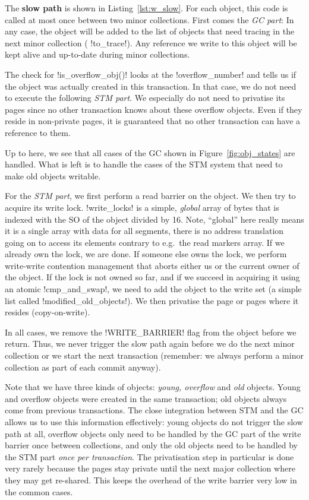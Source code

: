\documentclass{sigplanconf}
\makeatletter
\renewcommand\lstinline[1][]{%
  \Collectverb{\@@myverb}%
}
\def\@@myverb#1{%
    \begingroup
    \fboxsep=0.2em
    \colorbox{verylightgray}{\oldlstinline|#1|}%
    \endgroup
}
\makeatother
\begin{document}
The \textbf{slow path} is shown in Listing~\ref{lst:w_slow}.  For
each object, this code is called at most once between two minor collections.
First comes the \emph{GC part}: In any case, the object will be added
to the list of objects that need tracing in the next minor collection
(\lstinline!to_trace!). Any reference we write to this object will
be kept alive and up-to-date during minor collections.

The check for \lstinline!is_overflow_obj()! looks at the
\lstinline!overflow_number!  and tells us if the object was actually
created in this transaction. In that case, we do not need to execute
the following \emph{STM part}.  We especially do not need to privatise
its pages since no other transaction knows about these overflow
objects. Even if they reside in non-private pages, it is guaranteed
that no other transaction can have a reference to them.

Up to here, we see that all cases of the GC shown in
Figure~\ref{fig:obj_states} are handled. What is left is to handle the
cases of the STM system that need to make old objects writable.

For the \emph{STM part}, we first perform a read barrier on the
object. We then try to acquire its write lock. \lstinline!write_locks!
is a simple, \emph{global} array of bytes that is indexed with the
SO of the object divided by 16. Note, ``global'' here really means
it is a single array with data for all segments, there is no address
translation going on to access its elements contrary to e.g.\ the
read markers array.  If we already own the lock, we are done.
If someone else owns the lock, we perform  write-write contention
management that aborts either us or the current owner of the
object.  If the lock is not owned so far, and if we succeed in
acquiring it using an atomic
\lstinline!cmp_and_swap!, we need to add the object to the write set
(a simple list called \lstinline!modified_old_objects!).  We then
privatise the page or pages where it resides (copy-on-write).

In all cases, we remove the \lstinline!WRITE_BARRIER!  flag from the
object before we return. Thus, we never trigger the slow path again
before we do the next minor collection or we start the next
transaction (remember: we always perform a minor collection as part of
each commit anyway).

Note that we have three kinds of objects: \emph{young, overflow} and
\emph{old} objects. Young and overflow objects were created in the
same transaction; old objects always come from previous transactions.
The close integration between STM and the GC allows us to use this
information effectively: young objects do not trigger the slow path at
all, overflow objects only need to be handled by the GC part of the
write barrier once between collections, and only the old objects need
to be handled by the STM part \emph{once per transaction}. The
privatisation step in particular is done very rarely because the pages
stay private until the next major collection where they may get
re-shared. This keeps the overhead of the write barrier very low in
the common cases.
\end{document}
